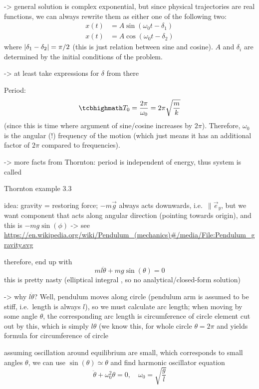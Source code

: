 \documentclass[../class_mech_main.tex]{subfiles}
\begin{document}
-> general solution is complex exponential, but since physical trajectories are real functions, we can always rewrite them as either one of the following two:
\begin{subequations}
	\begin{align}
		x(t) &= A \sin(\omega_0 t - \delta_1)
		\\
		x(t) &= A \cos(\omega_0 t - \delta_2)
	\end{align}
\end{subequations}
where $\abs{\delta_1 - \delta_2} = \pi/2$ (this is just relation between sine and cosine). $A$ and $\delta_i$ are determined by the initial conditions of the problem.

 -> at least take expressions for $\delta$ from there



Period:
\begin{equation}
	\eqbox{
		T_0 = \frac{2\pi}{\omega_0} = 2\pi \sqrt{\frac{m}{k}}
	}
\end{equation}
(since this is time where argument of sine/cosine increases by $2\pi$). Therefore, $\omega_0$ is the angular (!) frequency of the motion (which just means it has an additional factor of $2\pi$ compared to frequencies).

-> more facts from Thornton: period is independent of energy, thus system is called 



\begin{ex}[Pendulum]
	Thornton example 3.3


	idea: gravity = restoring force; $- m \vec{g}$ always acts downwards, i.e.~$\parallel \vec{e}_y$, but we want component that acts along angular direction (pointing towards origin), and this is $- m g \sin(\phi)$ -> see \url{https://en.wikipedia.org/wiki/Pendulum_(mechanics)#/media/File:Pendulum_gravity.svg}

	therefore, end up with
	\begin{equation}
		m l \ddot{\theta} + m g \sin(\theta) = 0
	\end{equation}
	this is pretty nasty (elliptical integral , so no analytical/closed-form solution)

	-> why $l \ddot{\theta}$? Well, pendulum moves along circle (pendulum arm is assumed to be stiff, i.e.~length is always $l$), so we must calculate arc length; when moving by some angle $\theta$, the corresponding arc length is circumference of circle element cut out by this, which is simply $l \theta$ (we know this, for whole circle $\theta = 2\pi$ and yields formula for circumference of circle

	assuming oscillation around equilibrium are small, which corresponds to small angles $\theta$, we can use $\sin(\theta) \simeq \theta$ and find harmonic oscillator equation
	\begin{equation}
		\ddot{\theta} + \omega_0^2 \theta = 0, \quad \omega_0 = \sqrt{\frac{g}{l}}
	\end{equation}
\end{ex}
\end{document}
